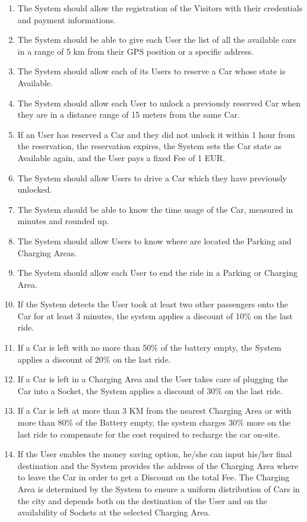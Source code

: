 \begin{enumerate}[label=\textbf{G\arabic*}]
	\item The System should allow the registration of the Visitors with their credentials and payment informations.
	\item The System should be able to give each User the list of all the available cars in a range of 5 km from their GPS position or a specific address.
	\item The System should allow each of its Users to reserve a Car whose state is Available.
	\item The System should allow each User to unlock a previously reserved Car when they are in a distance range of 15 meters from the same Car.
	\item If an User has reserved a Car and they did not unlock it within 1 hour from the reservation, the reservation expires, the System sets the Car state as Available again, and the User pays a fixed Fee of 1 EUR.  
	\item The System should allow Users to drive a Car which they have previously unlocked.
	\item The System should be able to know the time usage of the Car, measured in minutes and rounded up.
	\item The System should allow Users to know where are located the Parking and Charging Areas.
	\item The System should allow each User to end the ride in a Parking or Charging Area.
	\item If the System detects the User took at least two other passengers onto the Car for at least 3 minutes, the system applies a discount of 10\% on the last ride.
	\item If a Car is left with no more than 50\% of the battery empty, the System applies a discount of 20\% on the last ride. 
	\item If a Car is left in a Charging Area and the User takes care of plugging the Car into a Socket, the System applies a discount of 30\% on the last ride.
	\item If a Car is left at more than 3 KM from the nearest Charging Area or with more than 80\% of the Battery empty, the system charges 30\% more on the last ride to compensate for the cost required to recharge the car on-site.
	\item If the User enables the money saving option, he/she can input his/her final destination and the System provides the address of the Charging Area where to leave the Car in order to get a Discount on the total Fee. The Charging Area is determined by the System to ensure a uniform distribution of Cars in the city and depends both on the destination of the User and on the availability of Sockets at the selected Charging Area.
\end{enumerate}

